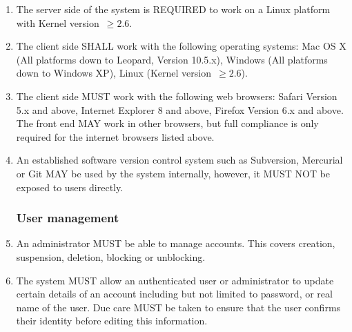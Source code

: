 \begin{enumerate}[1]
\item The server side of the system is REQUIRED to work on a Linux platform with Kernel version~$\ge 2.6$. 

\item The client side SHALL work with the following operating systems: Mac OS X (All platforms down to Leopard, Version 10.5.x), Windows (All platforms down to Windows XP), Linux (Kernel version~$\ge 2.6$).

\item The client side MUST work with the following web browsers: Safari Version 5.x and above, Internet Explorer 8 and above, Firefox Version 6.x and above. The front end MAY work in other browsers, but full compliance is only required for the internet browsers listed above.

\item An established software version control system such as Subversion, Mercurial or Git MAY be used by the system internally, however, it MUST NOT be exposed to users directly.

\subsubsection{User management}
\item An administrator MUST be able to manage accounts. This covers creation, suspension, deletion, blocking or unblocking.

\item The system MUST allow an authenticated user or administrator to update certain details of an account including but not limited to password, or real name of the user. Due care MUST be taken to ensure that the user confirms their identity before editing this information.
\end{enumerate}

